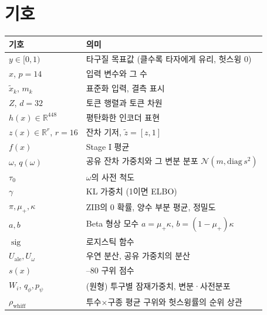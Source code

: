 \documentclass[journal,a4paper,10pt]{IEEEtran}
\newcommand{\sig}{\operatorname{sig}}
\newcommand{\N}{\mathcal{N}}
\begin{document}
\section{기호}
\label{app:notation}
\begin{center}
\footnotesize
\begin{tabular}{@{}>{\raggedright\arraybackslash}p{}>{\raggedright\arraybackslash}p{}@{}}
\toprule
기호 & 의미 \\
\midrule
$y\in[0,1)$ & 타구질 목표값 (클수록 타자에게 유리, 헛스윙 0) \\
$x$, $p=14$ & 입력 변수와 그 수 \\
$\tilde x_k$, $m_k$ & 표준화 입력, 결측 표시 \\
$Z$, $d=32$ & 토큰 행렬과 토큰 차원 \\
$h(x)\in\mathbb{R}^{448}$ & 평탄화한 인코더 표현 \\
$z(x)\in\mathbb{R}^{r}$, $r=16$ & 잔차 기저, $\tilde z=[z,1]$ \\
$f(x)$ & Stage I 평균 \\
$\omega$, $q(\omega)$ & 공유 잔차 가중치와 그 변분 분포 $\N(m,\mathrm{diag}\,s^2)$ \\
$\tau_0$ & $\omega$의 사전 척도 \\
$\gamma$ & KL 가중치 (1이면 ELBO) \\
$\pi,\mu_+,\kappa$ & ZIB의 0 확률, 양수 부분 평균, 정밀도 \\
$a,b$ & Beta 형상 모수 $a=\mu_+\kappa$, $b=(1-\mu_+)\kappa$ \\
$\sig$ & 로지스틱 함수 \\
$U_{\mathrm{ale}},U_\omega$ & 우연 분산, 공유 가중치의 분산 \\
$s(x)$ & 20–80 구위 점수 \\
$W_i$, $q_\phi,p_\psi$ & (원형) 투구별 잠재가중치, 변분·사전분포 \\
$\rho_{\mathrm{whiff}}$ & 투수×구종 평균 구위와 헛스윙률의 순위 상관 \\
\bottomrule
\end{tabular}
\end{center}
\end{document}
